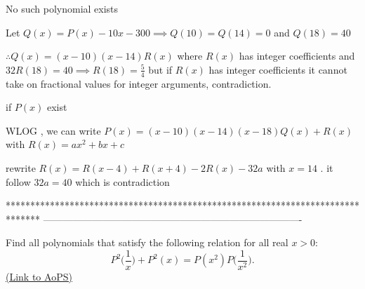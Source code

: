\begin{solution}
	No such polynomial exists

Let $ Q(x) = P(x) - 10x - 300 \implies Q(10) = Q(14) = 0$ and $ Q(18) = 40$

$ \therefore Q(x) = (x-10)(x-14)R(x)$ where $ R(x)$ has integer coefficients and $ 32 R(18) = 40 \implies R(18) = \frac{5}{4}$
but if $ R(x)$ has integer coefficients it cannot take on fractional values for integer arguments, contradiction.
\end{solution}



\begin{solution}
	if $ P(x)$ exist

WLOG , we can write $ P(x)=(x-10)(x-14)(x-18)Q(x)+R(x)$ with $ R(x) =ax^2+bx+c$

rewrite $ R(x)=R(x-4)+R(x+4)-2R(x)-32a$ with $ x=14$ . it follow $ 32a=40$ which is contradiction
\end{solution}
*******************************************************************************
-------------------------------------------------------------------------------

\begin{problem}
	Find all polynomials that satisfy the following relation for all real $ x>0$:
\[P^2\bigg(\dfrac1x\bigg)+P^2(x)=P(x^2)P\bigg(\dfrac1{x^2}\bigg).\]
	\flushright \href{https://artofproblemsolving.com/community/c6h307439}{(Link to AoPS)}
\end{problem}



